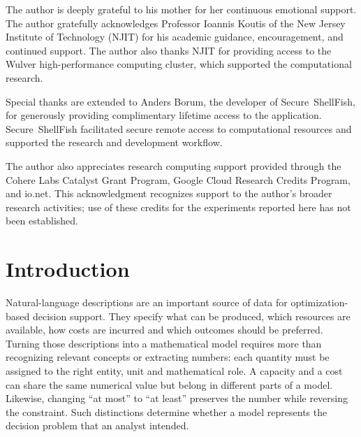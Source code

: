 \documentclass[pdflatex,sn-basic,Numbered]{sn-jnl}
\begin{document}
\maketitle


The author is deeply grateful to his mother for her continuous emotional support. The author gratefully acknowledges Professor Ioannis Koutis of the New Jersey Institute of Technology (NJIT) for his academic guidance, encouragement, and continued support. The author also thanks NJIT for providing access to the Wulver high-performance computing cluster, which supported the computational research.

Special thanks are extended to Anders Borum, the developer of \mbox{Secure ShellFish}, for generously providing complimentary lifetime access to the application. \mbox{Secure ShellFish} facilitated secure remote access to computational resources and supported the research and development workflow.

The author also appreciates research computing support provided through the Cohere Labs Catalyst Grant Program, Google Cloud Research Credits Program, and io.net. This acknowledgment recognizes support to the author's broader research activities; use of these credits for the experiments reported here has not been established.

\section{Introduction}

Natural-language descriptions are an important source of data for optimization-based decision support. They specify what can be produced, which resources are available, how costs are incurred and which outcomes should be preferred. Turning those descriptions into a mathematical model requires more than recognizing relevant concepts or extracting numbers: each quantity must be assigned to the right entity, unit and mathematical role. A capacity and a cost can share the same numerical value but belong in different parts of a model. Likewise, changing ``at most'' to ``at least'' preserves the number while reversing the constraint. Such distinctions determine whether a model represents the decision problem that an analyst intended.
\end{document}
